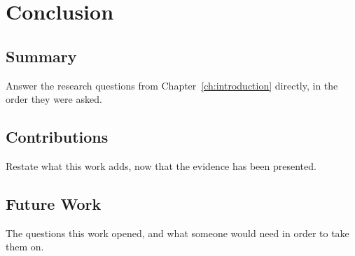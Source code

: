 \chapter{Conclusion}
\label{ch:conclusion}

\section{Summary}

Answer the research questions from Chapter~\ref{ch:introduction}
directly, in the order they were asked.

\section{Contributions}

Restate what this work adds, now that the evidence has been presented.

\section{Future Work}

The questions this work opened, and what someone would need in order to
take them on.
